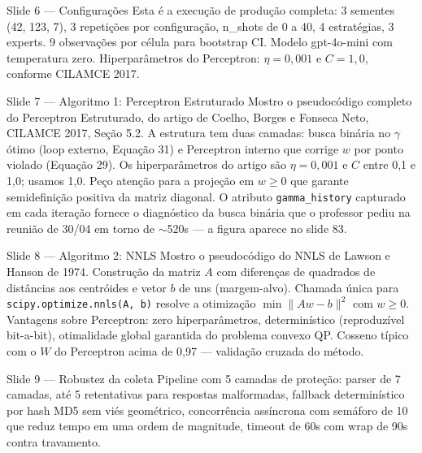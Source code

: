 \documentclass[aspectratio=169,10pt]{beamer}
\begin{document}
\begin{frame}{Slide 6 --- Configura\c{c}\~oes}
\footnotesize
Esta \'e a execu\c{c}\~ao de produ\c{c}\~ao completa: 3 sementes (42, 123, 7), 3 repeti\c{c}\~oes por configura\c{c}\~ao, n\_shots de 0 a 40, 4 estrat\'egias, 3 experts. 9 observa\c{c}\~oes por c\'elula para bootstrap CI. Modelo gpt-4o-mini com temperatura zero. Hiperpar\^ametros do Perceptron: $\eta=0{,}001$ e $C=1{,}0$, conforme CILAMCE 2017.
\end{frame}

\begin{frame}{Slide 7 --- Algoritmo 1: Perceptron Estruturado}
\footnotesize
Mostro o pseudoc\'odigo completo do Perceptron Estruturado, do artigo de Coelho, Borges e Fonseca Neto, CILAMCE 2017, Se\c{c}\~ao 5.2. A estrutura tem duas camadas: busca bin\'aria no $\gamma$ \'otimo (loop externo, Equa\c{c}\~ao 31) e Perceptron interno que corrige $w$ por ponto violado (Equa\c{c}\~ao 29). Os hiperpar\^ametros do artigo s\~ao $\eta=0{,}001$ e $C$ entre 0{,}1 e 1{,}0; usamos 1{,}0. Pe\c{c}o aten\c{c}\~ao para a proje\c{c}\~ao em $w \geq 0$ que garante semidefini\c{c}\~ao positiva da matriz diagonal. O atributo \texttt{gamma\_history} capturado em cada itera\c{c}\~ao fornece o diagn\'ostico da busca bin\'aria que o professor pediu na reuni\~ao de 30/04 em torno de $\sim$520s --- a figura aparece no slide 83.
\end{frame}

\begin{frame}{Slide 8 --- Algoritmo 2: NNLS}
\footnotesize
Mostro o pseudoc\'odigo do NNLS de Lawson e Hanson de 1974. Constru\c{c}\~ao da matriz $A$ com diferen\c{c}as de quadrados de dist\^ancias aos centr\'oides e vetor $b$ de uns (margem-alvo). Chamada \'unica para \texttt{scipy.optimize.nnls(A, b)} resolve a otimiza\c{c}\~ao $\min \|Aw-b\|^2$ com $w \geq 0$. Vantagens sobre Perceptron: zero hiperpar\^ametros, determin\'istico (reproduz\'ivel bit-a-bit), otimalidade global garantida do problema convexo QP. Cosseno t\'ipico com o $W$ do Perceptron acima de 0{,}97 --- valida\c{c}\~ao cruzada do m\'etodo.
\end{frame}

\begin{frame}{Slide 9 --- Robustez da coleta}
\footnotesize
Pipeline com 5 camadas de prote\c{c}\~ao: parser de 7 camadas, at\'e 5 retentativas para respostas malformadas, fallback determin\'istico por hash MD5 sem vi\'es geom\'etrico, concorr\^encia ass\'incrona com sem\'aforo de 10 que reduz tempo em uma ordem de magnitude, timeout de 60s com wrap de 90s contra travamento.
\end{frame}
\end{document}
